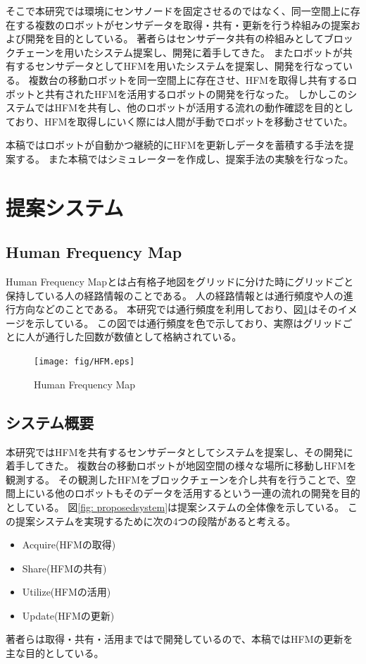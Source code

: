 \documentclass{jsarticle}
\begin{document}
そこで本研究では環境にセンサノードを固定させるのではなく、同一空間上に存在する複数のロボットがセンサデータを取得・共有・更新を行う枠組みの提案および開発を目的としている。
著者らはセンサデータ共有の枠組みとしてブロックチェーンを用いたシステム提案し、開発に着手してきた\cite{robo2018}。
またロボットが共有するセンサデータとしてHFMを用いたシステムを提案し、開発を行なっている\cite{si2018}\cite{kato}。
複数台の移動ロボットを同一空間上に存在させ、HFMを取得し共有するロボットと共有されたHFMを活用するロボットの開発を行なった。
しかしこのシステムではHFMを共有し、他のロボットが活用する流れの動作確認を目的としており、HFMを取得しにいく際には人間が手動でロボットを移動させていた。

本稿ではロボットが自動かつ継続的にHFMを更新しデータを蓄積する手法を提案する。
また本稿ではシミュレーターを作成し、提案手法の実験を行なった。


\section{提案システム}
\subsection{Human Frequency Map}
Human Frequency Mapとは占有格子地図をグリッドに分けた時にグリッドごと保持している人の経路情報のことである。
人の経路情報とは通行頻度や人の進行方向などのことである。
本研究では通行頻度を利用しており、図\ref{fig: HFM}はそのイメージを示している。
この図では通行頻度を色で示しており、実際はグリッドごとに人が通行した回数が数値として格納されている。
\begin{figure}[tbh]
 \centering
  \texttt{[image: fig/HFM.eps]}
  \vspace*{-4mm}
  \caption{Human Frequency Map}
  \label{fig: HFM}
\end{figure}

\subsection{システム概要}
本研究ではHFMを共有するセンサデータとしてシステムを提案し、その開発に着手してきた。
複数台の移動ロボットが地図空間の様々な場所に移動しHFMを観測する。
その観測したHFMをブロックチェーンを介し共有を行うことで、空間上にいる他のロボットもそのデータを活用するという一連の流れの開発を目的としている。
図\ref{fig: proposedsystem}は提案システムの全体像を示している。
この提案システムを実現するために次の4つの段階があると考える。
\begin{itemize}
  \item Acquire(HFMの取得)
  \item Share(HFMの共有)
  \item Utilize(HFMの活用)
  \item Update(HFMの更新)
\end{itemize}
著者らは取得・共有・活用までは\cite{si2018}で開発しているので、本稿ではHFMの更新を主な目的としている。
\end{document}
